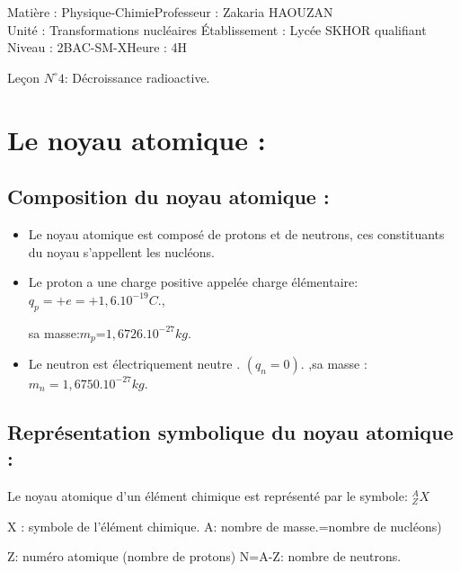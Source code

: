 \documentclass[12pt]{article}
\author{Zakaria HAOUZAN}
\date{\today}
\newcommand\headerMe[2]{\noindent{}#1\hfill#2}
\begin{document}
\headerMe{Matière : Physique-Chimie}{Professeur : Zakaria HAOUZAN}\\
\headerMe{Unité : Transformations nucléaires }{Établissement : Lycée SKHOR qualifiant}\\
\headerMe{Niveau : 2BAC-SM-X}{Heure : 4H}\\

\begin{center}

    \Large{Leçon $N^{\circ} 4 $: \color{red}Décroissance radioactive. }
\end{center}



\section{ Le noyau atomique : }

\subsection{Composition du noyau atomique : }
\begin{itemize}
	\item Le noyau atomique est composé de protons et de neutrons, ces constituants du noyau s'appellent les nucléons.

	\item Le proton a une charge positive appelée charge élémentaire: $q_p=+e=+1,6.10^{-19}C$., 

		sa masse:$m_p$=$1,6726.10^{-27}kg$.
	\item Le neutron est électriquement neutre . $(q_n=0)$. ,sa masse : $m_n=1,6750.10^{ -27}kg$.
\end{itemize}

\subsection{ Représentation symbolique du noyau atomique : }
Le noyau atomique d'un élément chimique est représenté par le symbole: $_Z^AX$

X : symbole de l'élément chimique. \hspace{0.5cm} A: nombre de masse.=nombre de nucléons)

Z: numéro atomique (nombre de protons)  N=A-Z: nombre de neutrons.
\end{document}
